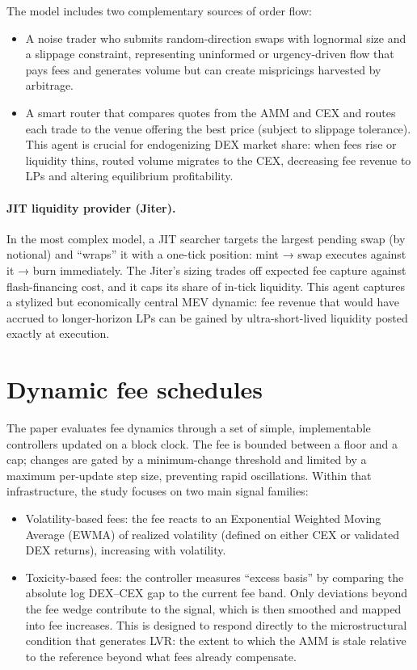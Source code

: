 \documentclass[11pt]{article}
\begin{document}
The model includes two complementary sources of order flow:

\begin{itemize}
    \item A noise trader who submits random-direction swaps with lognormal size and a slippage constraint, representing uninformed or urgency-driven 
    flow that pays fees and generates volume but can create mispricings harvested by arbitrage. 
    \item A smart router that compares quotes from the AMM and CEX and routes each trade to the venue offering the best price (subject to slippage tolerance). 
    This agent is crucial for endogenizing DEX market share: when fees rise or liquidity thins, routed volume migrates to the CEX, decreasing fee 
    revenue to LPs and altering equilibrium profitability. 
\end{itemize}

\paragraph{JIT liquidity provider (Jiter).}

In the most complex model, a JIT searcher targets the largest pending swap (by notional) and “wraps” it with a one-tick position: 
mint → swap executes against it → burn immediately. The Jiter’s sizing trades off expected fee capture against flash-financing cost, 
and it caps its share of in-tick liquidity. This agent captures a stylized but economically central MEV dynamic: fee revenue that would 
have accrued to longer-horizon LPs can be gained by ultra-short-lived liquidity posted exactly at execution. 

\section{Dynamic fee schedules}

The paper evaluates fee dynamics through a set of simple, implementable controllers updated on a block clock. The fee is 
bounded between a floor and a cap; changes are gated by a minimum-change threshold and limited by a maximum per-update step size, preventing rapid oscillations. Within that infrastructure,  
the study focuses on two main signal families:

\begin{itemize}
    \item Volatility-based fees: the fee reacts to an Exponential Weighted Moving Average (EWMA) of realized volatility 
    (defined on either CEX or validated DEX returns), increasing with volatility. 
    \item Toxicity-based fees: the controller measures “excess basis” by comparing the absolute log DEX--CEX gap to the 
    current fee band. Only deviations beyond the fee wedge contribute to the signal, which is then smoothed and mapped 
    into fee increases. This is designed to respond directly to the microstructural condition that generates LVR: 
    the extent to which the AMM is stale relative to the reference beyond what fees already compensate. 
\end{itemize}
\end{document}
